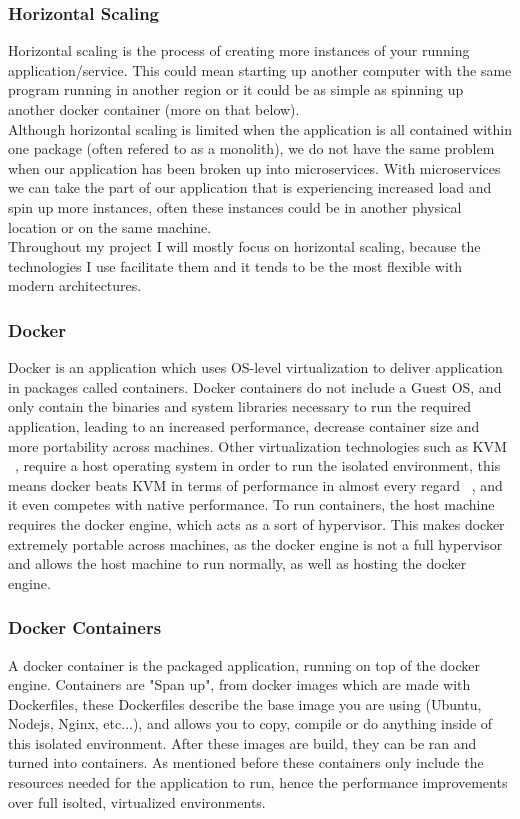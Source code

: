 \documentclass[titlepage]{article}
\begin{document}
\subsubsection{Horizontal Scaling}
Horizontal scaling is the process of creating more instances of your running application/service. This could mean starting up another computer with the same program running in another region or it could be as simple as spinning up another docker container (more on that below). \\

Although horizontal scaling is limited when the application is all contained within one package (often refered to as a monolith), we do not have the same problem when our application has been broken up into microservices. With microservices we can take the part of our application that is experiencing increased load and spin up more instances, often these instances could be in another physical location or on the same machine. \\

Throughout my project I will mostly focus on horizontal scaling, because the technologies I use facilitate them and it tends to be the most flexible with modern architectures.

\subsubsection{Docker}
Docker is an application which uses OS-level virtualization to deliver application in packages called containers. Docker containers do not include a Guest OS, and only contain the binaries and system libraries necessary to run the required application, leading to an increased performance, decrease container size and more portability across machines. Other virtualization technologies such as KVM ~\cite{kvm}, require a host operating system in order to run the isolated environment, this means docker beats KVM in terms of performance in almost every regard ~\cite{docker_performance}, and it even competes with native performance. To run containers, the host machine requires the docker engine, which acts as a sort of hypervisor. This makes docker extremely portable across machines, as the docker engine is not a full hypervisor and allows the host machine to run normally, as well as hosting the docker engine.

\subsubsection{Docker Containers}
A docker container is the packaged application, running on top of the docker engine. Containers are "Span up", from docker images which are made with Dockerfiles, these Dockerfiles describe the base image you are using (Ubuntu, Nodejs, Nginx, etc...), and allows you to copy, compile or do anything inside of this isolated environment. After these images are build, they can be ran and turned into containers. As mentioned before these containers only include the resources needed for the application to run, hence the performance improvements over full isolted, virtualized environments.
\end{document}
